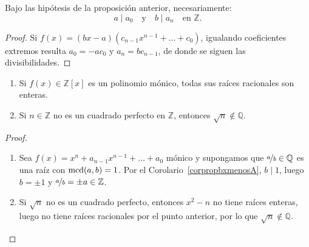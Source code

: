 \begin{coro}\label{corpropbxmenosA}
    Bajo las hipótesis de la proposición anterior, necesariamente:
    \[
        a \mid a_0 \quad \text{y} \quad b \mid a_n \quad \text{en } \mathbb{Z}.
    \]
\end{coro}

\begin{proof}
    Si $f(x) = (bx - a)(c_{n-1} x^{n-1} + \dots + c_0)$, igualando coeficientes extremos resulta $a_0 = -a c_0$ y $a_n = b c_{n-1}$, de donde se siguen las divisibilidades.
\end{proof}

\begin{coro}
    \leavevmode
    \begin{enumerate}[label=\arabic*)]
        \item Si $f(x) \in \mathbb{Z}[x]$ es un polinomio mónico, todas sus raíces racionales son enteras.
        \item Si $n \in \mathbb{Z}$ no es un cuadrado perfecto en $\mathbb{Z}$, entonces $\sqrt{n} \notin \mathbb{Q}$.
    \end{enumerate}
\end{coro}
\begin{proof}
    \leavevmode
    \begin{enumerate}[label=\arabic*)]
        \item Sea $f(x) = x^n + a_{n-1} x^{n-1} + \dots + a_0$ mónico y supongamos que $\nicefrac{a}{b} \in \mathbb{Q}$ es una raíz con $\operatorname{mcd}(a,b) = 1$. Por el Corolario~\ref{corpropbxmenosA}, $b \mid 1$, luego $b = \pm 1$ y $\nicefrac{a}{b} = \pm a \in \mathbb{Z}$.
        \item Si $\sqrt{n}$ no es un cuadrado perfecto, entonces $x^2 - n$ no tiene raíces enteras, luego no tiene raíces racionales por el punto anterior, por lo que $\sqrt{n} \notin \mathbb{Q}$.
    \end{enumerate}
\end{proof}

